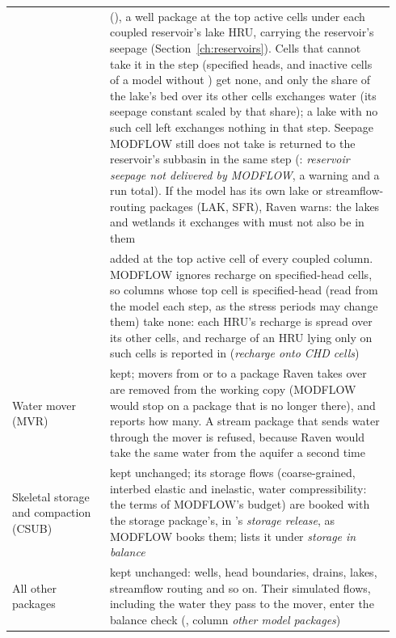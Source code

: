\begin{longtable}{P{0.24\linewidth}P{0.70\linewidth}}
 &  (), a well package at the top active cells under each coupled reservoir's lake HRU, carrying the reservoir's seepage (Section~\ref{ch:reservoirs}). Cells that cannot take it in the step (specified heads, and inactive cells of a model without ) get none, and only the share of the lake's bed over its other cells exchanges water (its seepage constant scaled by that share); a lake with no such cell left exchanges nothing in that step. Seepage MODFLOW still does not take is returned to the reservoir's subbasin in the same step (: \emph{reservoir seepage not delivered by MODFLOW}, a warning and a run total). If the model has its own lake or streamflow-routing packages (LAK, SFR), Raven warns: the lakes and wetlands it exchanges with must not also be in them\\
 & added at the top active cell of every coupled column. MODFLOW ignores recharge on specified-head cells, so columns whose top cell is specified-head (read from the model each step, as the stress periods may change them) take none: each HRU's recharge is spread over its other cells, and recharge of an HRU lying only on such cells is reported in  (\emph{recharge onto CHD cells})\\
Water mover (MVR) & kept; movers from or to a package Raven takes over are removed from the working copy (MODFLOW would stop on a package that is no longer there), and  reports how many. A stream package that sends water through the mover is refused, because Raven would take the same water from the aquifer a second time\\
Skeletal storage and compaction (CSUB) & kept unchanged; its storage flows (coarse-grained, interbed elastic and inelastic, water compressibility: the  terms of MODFLOW's budget) are booked with the storage package's, in 's \emph{storage release}, as MODFLOW books them;  lists it under \emph{storage in balance}\\
All other packages & kept unchanged: wells, head boundaries, drains, lakes, streamflow routing and so on. Their simulated flows, including the water they pass to the mover, enter the balance check (, column \emph{other model packages})\\\bottomrule
\end{longtable}

